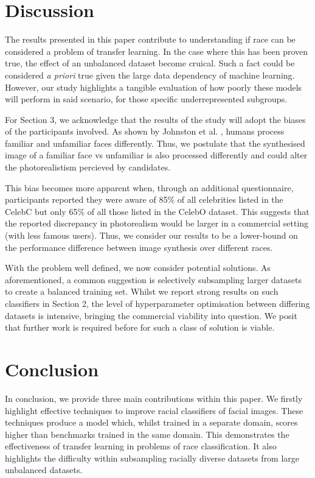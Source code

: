 \documentclass[10pt,twocolumn,letterpaper]{article}
\begin{document}
\section{Discussion}

The results presented in this paper contribute to understanding if race can be considered a problem of transfer learning. In the case where this has been proven true, the effect of an unbalanced dataset become cruical. Such a fact could be considered \textit{a priori} true given the large data dependency of machine learning. However, our study highlights a tangible evaluation of how poorly these models will perform in said scenario, for those specific underrepresented subgroups. 

For Section 3, we acknowledge that the results of the study will adopt the biases of the participants involved. As shown by Johnston et al. \cite{johnston2009familiar}, humans process familiar and unfamiliar faces differently. Thus, we postulate that the synthesised image of a familiar face vs unfamiliar is also processed differently and could alter the photorealistism percieved by candidates. 

This bias becomes more apparent when, through an additional questionnaire, participants reported they were aware of 85\% of all celebrities listed in the CelebC but only 65\% of all those listed in the CelebO dataset. This suggests that the reported discrepancy in photorealism would be larger in a commercial setting (with less famous users). Thus, we consider our results to be a lower-bound on the performance difference between image synthesis over different races.

With the problem well defined, we now consider potential solutions. As aforementioned, a common suggestion is selectively subsampling larger datasets to create a balanced training set. Whilst we report strong results on such classifiers in Section 2, the level of hyperparameter optimisation between differing datasets is intensive, bringing the commercial viability into question. We posit that further work is  required before for such a class of solution is viable.


\section{Conclusion}
In conclusion, we provide three main contributions within this paper. We firstly highlight effective techniques to improve racial classifiers of facial images. These techniques produce a model which, whilst trained in a separate domain, scores higher than benchmarks trained in the same domain. This demonstrates the effectiveness of transfer learning in problems of race classification. It also highlights the difficulty within subsampling racially diverse datasets from large unbalanced datasets.
\end{document}
